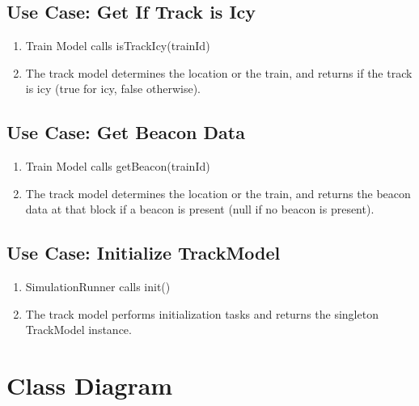 \documentclass{scrreprt}
\begin{document}
\subsection{Use Case: Get If Track is Icy}
\begin{enumerate}
	\item Train Model calls isTrackIcy(trainId)
	\item The track model determines the location or the train, and returns if the track is icy (true for icy, false otherwise).
\end{enumerate}

\subsection{Use Case: Get Beacon Data}
\begin{enumerate}
	\item Train Model calls getBeacon(trainId)
	\item The track model determines the location or the train, and returns the beacon data at that block if a beacon is present (null if no beacon is present).
\end{enumerate}

\subsection{Use Case: Initialize TrackModel}
\begin{enumerate}
	\item SimulationRunner calls init()
	\item The track model performs initialization tasks and returns the singleton TrackModel instance.
\end{enumerate}


\section{Class Diagram}
\end{document}
